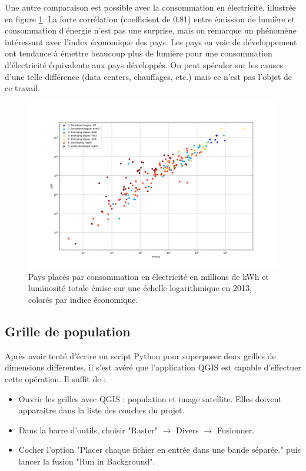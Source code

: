 \documentclass[a4paper, 11pt]{report}
\begin{document}
Une autre comparaison est possible avec la consommation en électricité, illustrée en figure \ref{country_energypop_scatter}. La forte corrélation (coefficient de 0.81) entre émission de lumière et consommation d'énergie n'est pas une surprise, mais on remarque un phénomène intéressant avec l'index économique des pays. Les pays en voie de développement ont tendance à émettre beaucoup plus de lumière pour une consommation d'électricité équivalente aux pays développés. On peut spéculer sur les causes d'une telle différence (data centers, chauffages, etc.) mais ce n'est pas l'objet de ce travail.

\begin{figure}
	\centering
	\includegraphics[width=1.0\textwidth]{img/energy-light.png}
	\caption{Pays placés par consommation en électricité en millions de kWh et luminosité totale émise sur une échelle logarithmique en 2013, colorés par indice économique.}
	\label{country_energypop_scatter}
\end{figure}

\subsection{Grille de population}

Après avoir tenté d'écrire un script Python pour superposer deux grilles de dimensions différentes, il s'est avéré que l'application QGIS est capable d'effectuer cette opération. Il suffit de :

\begin{itemize}
	\item Ouvrir les grilles avec QGIS : population et image satellite. Elles doivent apparaitre dans la liste des couches du projet.
	\item Dans la barre d'outils, choisir "Raster" $\rightarrow$ Divers $\rightarrow$ Fusionner.
	\item Cocher l'option "Placer chaque fichier en entrée dans une bande séparée." puis lancer la fusion "Run in Background".
\end{itemize}
\end{document}

